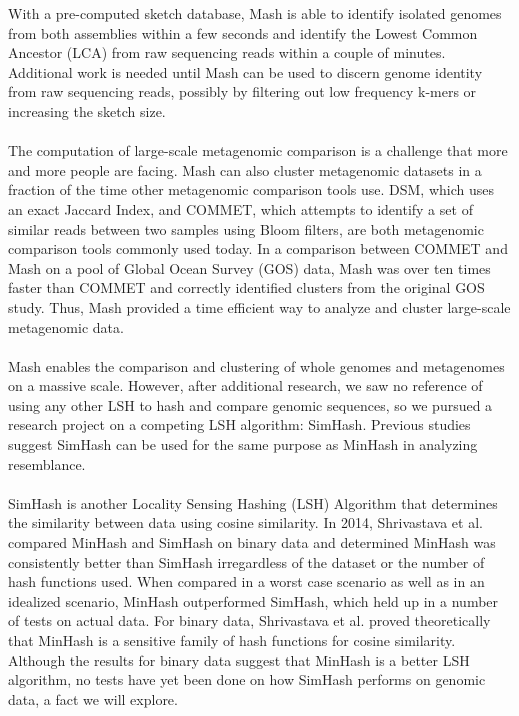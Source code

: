 \documentclass[12pt, letterpaper]{article}
\begin{document}
With a pre-computed sketch database, Mash is able to identify isolated genomes from both assemblies within a few seconds and identify the Lowest Common Ancestor (LCA) from raw sequencing reads within a couple of minutes. Additional work is needed until Mash can be used to discern genome identity from raw sequencing reads, possibly by filtering out low frequency k-mers or increasing the sketch size. \\ \\
The computation of large-scale metagenomic comparison is a challenge that more and more people are facing. Mash can also cluster metagenomic datasets in a fraction of the time other metagenomic comparison tools use. DSM, which uses an exact Jaccard Index, and COMMET, which attempts to identify a set of similar reads between two samples using Bloom filters, are both metagenomic comparison tools commonly used today. In a comparison between COMMET and Mash on a pool of Global Ocean Survey (GOS) data, Mash was over ten times faster than COMMET and correctly identified clusters from the original GOS study. Thus, Mash provided a time efficient way to analyze and cluster large-scale metagenomic data. \\ \\
Mash enables the comparison and clustering of whole genomes and metagenomes on a massive scale. However, after additional research, we saw no reference of using any other LSH to hash and compare genomic sequences, so we pursued a research project on a competing LSH algorithm: SimHash. Previous studies suggest SimHash can be used for the same purpose as MinHash in analyzing resemblance. \\ \\
SimHash is another Locality Sensing Hashing (LSH) Algorithm that determines the similarity between data using cosine similarity. In 2014, Shrivastava et al. compared MinHash and SimHash on binary data and determined MinHash was consistently better than SimHash irregardless of the dataset or the number of hash functions used.\cite{MinvsSim} When compared in a worst case scenario as well as in an idealized scenario, MinHash outperformed SimHash, which held up in a number of tests on actual data. For binary data, Shrivastava et al. proved theoretically that MinHash is a sensitive family of hash functions for cosine similarity. Although the results for binary data suggest that MinHash is a better LSH algorithm, no tests have yet been done on how SimHash performs on genomic data, a fact we will explore.
\end{document}
